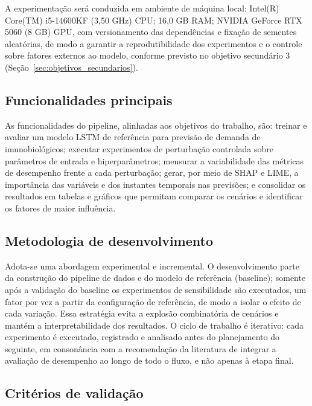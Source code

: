 \documentclass[
    12pt,                %
    openright,           %
    oneside,             %
    a4paper,             %
    english,             %
    brazil               %
]{abntex2}
\begin{document}
A experimentação será conduzida em ambiente de máquina local: Intel(R) Core(TM) i5-14600KF (3,50 GHz) CPU; 16,0 GB RAM; NVIDIA GeForce RTX 5060 (8 GB) GPU, com versionamento das dependências e fixação de sementes aleatórias, de modo a garantir a reprodutibilidade dos experimentos e o controle sobre fatores externos ao modelo, conforme previsto no objetivo secundário 3 (Seção~\ref{sec:objetivos_secundarios}).

\subsection{Funcionalidades principais}
\label{subsec:funcionalidades}

As funcionalidades do pipeline, alinhadas aos objetivos do trabalho, são: treinar e avaliar um modelo LSTM de referência para previsão de demanda de imunobiológicos; executar experimentos de perturbação controlada sobre parâmetros de entrada e hiperparâmetros; mensurar a variabilidade das métricas de desempenho frente a cada perturbação; gerar, por meio de SHAP e LIME, a importância das variáveis e dos instantes temporais nas previsões; e consolidar os resultados em tabelas e gráficos que permitam comparar os cenários e identificar os fatores de maior influência.

\subsection{Metodologia de desenvolvimento}
\label{subsec:metodologia_dev}

Adota-se uma abordagem experimental e incremental. O desenvolvimento parte da construção do pipeline de dados e do modelo de referência (baseline); somente após a validação do baseline os experimentos de sensibilidade são executados, um fator por vez a partir da configuração de referência, de modo a isolar o efeito de cada variação. Essa estratégia evita a explosão combinatória de cenários e mantém a interpretabilidade dos resultados. O ciclo de trabalho é iterativo: cada experimento é executado, registrado e analisado antes do planejamento do seguinte, em consonância com a recomendação da literatura de integrar a avaliação de desempenho ao longo de todo o fluxo, e não apenas à etapa final.

\subsection{Critérios de validação}
\label{subsec:criterios_validacao}
\end{document}
